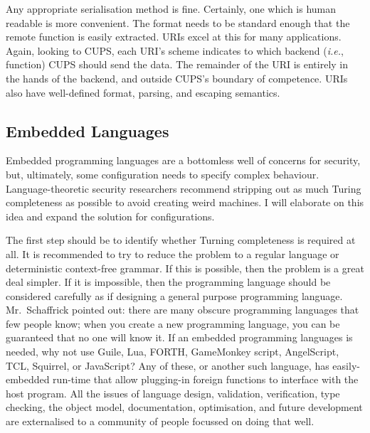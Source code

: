 \documentclass[letterpaper,twocolumn,10pt]{article}
\begin{document}
Any appropriate serialisation method is fine. Certainly, one which is human readable is more convenient. The format needs to be standard enough that the remote function is easily extracted. URIs excel at this for many applications. Again, looking to CUPS, each URI's scheme indicates to which backend (\emph{i.e.}, function) CUPS should send the data. The remainder of the URI is entirely in the hands of the backend, and outside CUPS's boundary of competence. URIs also have well-defined format, parsing, and escaping semantics.

\subsection{Embedded Languages}
Embedded programming languages are a bottomless well of concerns for security, but, ultimately, some configuration needs to specify complex behaviour. Language-theoretic security researchers recommend stripping out as much Turing completeness as possible to avoid creating weird machines. I will elaborate on this idea and expand the solution for configurations.

The first step should be to identify whether Turning completeness is required at all. It is recommended to try to reduce the problem to a regular language or deterministic context-free grammar. If this is possible, then the problem is a great deal simpler. If it is impossible, then the programming language should be considered carefully as if designing a general purpose programming language. Mr.~Schaffrick pointed out: there are many obscure programming languages that few people know; when you create a new programming language, you can be guaranteed that no one will know it. If an embedded programming languages is needed, why not use Guile, Lua, FORTH, GameMonkey script, AngelScript, TCL, Squirrel, or JavaScript? Any of these, or another such language, has easily-embedded run-time that allow plugging-in foreign functions to interface with the host program. All the issues of language design, validation, verification, type checking, the object model, documentation, optimisation, and future development are externalised to a community of people focussed on doing that well.
\end{document}
